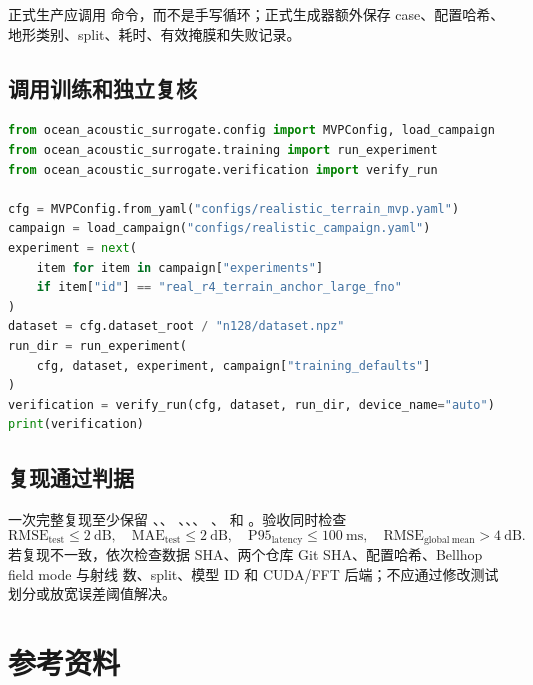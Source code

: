 \documentclass[UTF8,11pt]{ctexart}
\newcommand{\RMSE}{\mathrm{RMSE}}
\begin{document}
正式生产应调用  命令，而不是手写循环；正式生成器额外保存 case、配置哈希、
地形类别、split、耗时、有效掩膜和失败记录。

\subsection{调用训练和独立复核}

\begin{lstlisting}[style=repro,language=Python]
from ocean_acoustic_surrogate.config import MVPConfig, load_campaign
from ocean_acoustic_surrogate.training import run_experiment
from ocean_acoustic_surrogate.verification import verify_run

cfg = MVPConfig.from_yaml("configs/realistic_terrain_mvp.yaml")
campaign = load_campaign("configs/realistic_campaign.yaml")
experiment = next(
    item for item in campaign["experiments"]
    if item["id"] == "real_r4_terrain_anchor_large_fno"
)
dataset = cfg.dataset_root / "n128/dataset.npz"
run_dir = run_experiment(
    cfg, dataset, experiment, campaign["training_defaults"]
)
verification = verify_run(cfg, dataset, run_dir, device_name="auto")
print(verification)
\end{lstlisting}

\subsection{复现通过判据}

一次完整复现至少保留 、、
、、、
、 和
。验收同时检查
\begin{equation}
  \RMSE_{\mathrm{test}}\le2\ \mathrm{dB},\quad
  \mathrm{MAE}_{\mathrm{test}}\le2\ \mathrm{dB},\quad
  \mathrm{P95}_{\mathrm{latency}}\le100\ \mathrm{ms},\quad
  \RMSE_{\mathrm{global\ mean}}>4\ \mathrm{dB}.
\end{equation}
若复现不一致，依次检查数据 SHA、两个仓库 Git SHA、配置哈希、Bellhop field mode 与射线
数、split、模型 ID 和 CUDA/FFT 后端；不应通过修改测试划分或放宽误差阈值解决。

\section{参考资料}
\end{document}

